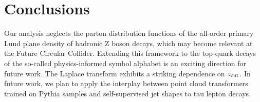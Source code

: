 \section{Conclusions}\label{sec:conclusions}

Our analysis neglects the parton distribution functions of the all-order
primary Lund plane density of hadronic Z boson decays, which may become
relevant at the Future Circular Collider. Extending this framework to
the top-quark decays of the so-called physics-informed symbol alphabet
is an exciting direction for future work. The Laplace transform exhibits
a striking dependence on $z_{\rm cut}$. In future work, we plan to apply
the interplay between point cloud transformers trained on Pythia samples
and self-supervised jet shapes to tau lepton decays.

